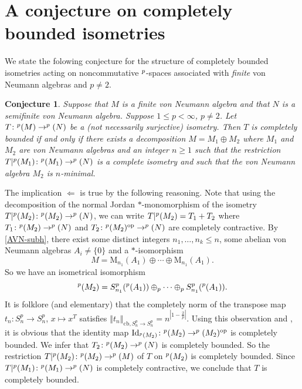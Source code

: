\documentclass[leqno]{article} %
\let\L\relax
\newcommand{\L}{\mathrm{L}}
\newcommand{\M}{\mathrm{M}}
\renewcommand{\leq}{\ensuremath{\leqslant}}
\renewcommand{\geq}{\ensuremath{\geqslant}}
\newcommand{\norm}[1]{\left\Vert#1\right\Vert}
\newcommand{\co}{\colon}
\newcommand{\Id}{\mathrm{Id}} %
\newcommand{\op}{\mathrm{op}} %
\newcommand{\cb}{\mathrm{cb}} %
\newtheorem{conj}[thm]{Conjecture}
\numberwithin{equation}{section}
\begin{document}
\section{A conjecture on completely bounded isometries}
\label{Section-cb-isometries}

We state the folowing conjecture for the structure of completely bounded isometries acting on noncommutative $\L^p$-spaces associated with \textit{finite} von Neumann algebras and $p \not=2$.

\begin{conj}
\label{Th-main}
Suppose that $M$ is a finite von Neumann algebra and that $N$ is a semifinite von Neumann algebra. Suppose $1 \leq p< \infty$, $p \not=2$. Let $T \co \L^p(M) \to \L^p(N)$ be a (not necessarily surjective) isometry. Then $T$ is completely bounded if and only if there exists a decomposition $M=M_1 \oplus M_2$ where $M_1$ and $M_2$ are von Neumann algebras and an integer $n \geq 1$ such that the restriction $T|\L^p(M_1) \co \L^p(M_1) \to \L^p(N)$ is a complete isometry and such that the von Neumann algebra $M_2$ is $n$-minimal.
\end{conj}



The implication $\Leftarrow$ is true by the following reasoning. Note that using the decomposition of the normal Jordan $*$-monomorphism of the isometry $T| \L^p(M_2) \co \L^p(M_2) \to \L^p(N)$, we can write $T| \L^p(M_2)=T_1+T_2$ where $T_1 \co \L^p(M_2) \to \L^p(N)$ and $T_2 \co \L^p(M_2)^\op \to \L^p(N)$ are completely contractive. By \eqref{AVN-subh}, there exist some distinct integers $n_1,\ldots,n_k \leq n$, some abelian von Neumann algebras $A_i \not=\{0\}$ and a $*$-isomorphism
\begin{equation*}
\label{AVN-subhomogeneus-2}
M
=\M_{n_1}(A_1) \oplus \cdots \oplus \M_{n_1}(A_1).
\end{equation*} 
So we have an isometrical isomorphism
\begin{equation*}
\label{AVN-subhomogeneus}
\L^p(M_2)
=S^p_{n_1}(\L^p(A_1)) \oplus_p \cdots \oplus_p S^p_{n_1}(\L^p(A_1)).
\end{equation*} 
It is folklore (and elementary) that the completely norm of the transpose map $t_n \co S^p_n \to S^p_n$, $x \mapsto x^T$ satisfies $\norm{t_n}_{\cb,S^p_n \to S^p_n} = n^{|1-\frac{2}{p}|}$. Using this observation and \cite[page 2]{Jun}, it is obvious that the identity map $\Id_{\L^p(M_2)} \co \L^p(M_2) \to \L^p(M_2)^\op$ is completely bounded. We infer that $T_2 \co \L^p(M_2) \to \L^p(N)$ is completely bounded. So the restriction $T| \L^p(M_2) \co \L^p(M_2) \to \L^p(M)$ of $T$ on $\L^p(M_2)$ is completely bounded. Since $T|\L^p(M_1) \co \L^p(M_1) \to \L^p(N)$ is completely contractive, we conclude that $T$ is completely bounded.
\end{document}
